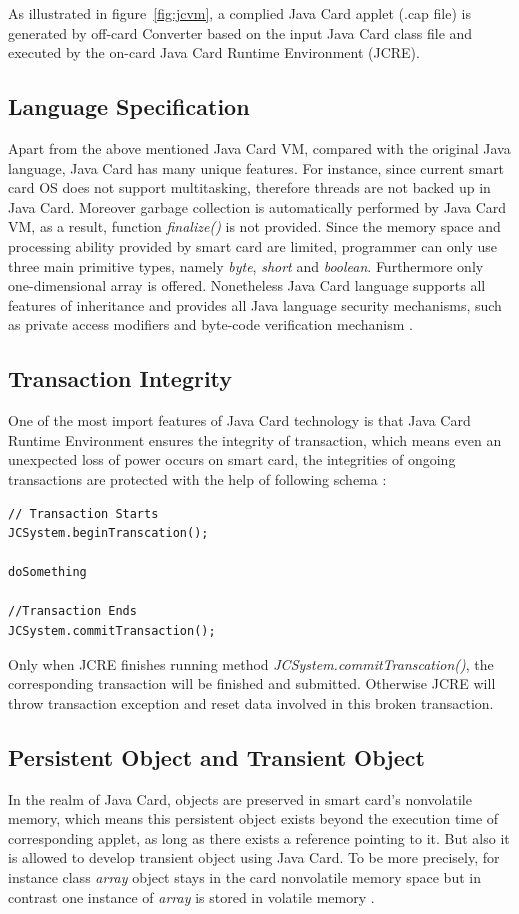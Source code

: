 As illustrated in figure~\ref{fig:jcvm}, a complied Java Card applet (.cap file) is generated by off-card Converter based on the input Java Card class file and executed by the on-card Java Card Runtime Environment (JCRE). 





\subsection{Language Specification}
Apart from the above mentioned Java Card VM, compared with the original Java language, Java Card has many unique features. For instance,
since current smart card OS does not support multitasking, therefore threads are not backed up in Java Card. Moreover garbage collection is automatically performed by Java Card VM, as a result, function \emph{finalize()} is not provided. Since the memory space and processing ability provided by smart card are limited, programmer can only use three main primitive types, namely \emph{byte}, \emph{short} and \emph{boolean}. Furthermore only one-dimensional array is offered. Nonetheless Java Card language supports all features of inheritance and provides all Java language security mechanisms, such as private access modifiers and byte-code verification mechanism \cite{jcadg}.

\subsection{Transaction Integrity}
One of the most import features of Java Card technology is that Java Card Runtime Environment ensures the integrity of transaction, which means even an unexpected loss of power occurs on smart card, the integrities of ongoing transactions are protected with the help of following schema \cite{handbuch}:
\begin{verbatim}
// Transaction Starts
JCSystem.beginTranscation();

doSomething

//Transaction Ends
JCSystem.commitTransaction();
\end{verbatim}
Only when JCRE finishes running method \emph{JCSystem.commitTranscation()}, the corresponding transaction will be finished and submitted. Otherwise JCRE will throw transaction exception and reset data involved in this broken transaction.

\subsection{Persistent Object and Transient Object}
In the realm of Java Card, objects are preserved in smart card's nonvolatile memory, which means this persistent object exists beyond the execution time of corresponding applet, as long as there exists a reference pointing to it. But also it is allowed to develop transient object using Java Card. To be more precisely, for instance class \emph{array} object stays in the card nonvolatile memory space but in contrast one instance of \emph{array} is stored in volatile memory \cite{handbuch}.

